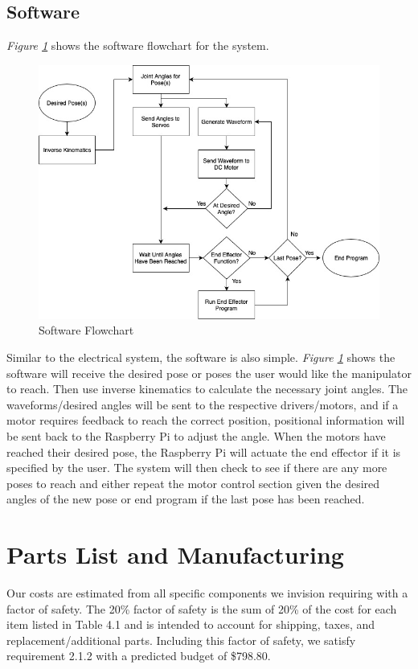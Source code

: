 \documentclass[12pt]{report}
\begin{document}
\subsection{Software}
\emph{Figure \ref{fig:sblock}} shows the software flowchart for the system.
\begin{figure}[ht]
  \centering
  \includegraphics[width=.85\textwidth]{sblock}
  \caption{Software Flowchart}
  \label{fig:sblock}
\end{figure}

Similar to the electrical system, the software is also simple. \emph{Figure \ref{fig:sblock}} shows the software will receive the desired pose or poses the user would like the manipulator to reach. Then use inverse kinematics to calculate the necessary joint angles. The waveforms/desired angles will be sent to the respective drivers/motors, and if a motor requires feedback to reach the correct position, positional information will be sent back to the Raspberry Pi to adjust the angle. When the motors have reached their desired pose, the Raspberry Pi will actuate the end effector if it is specified by the user. The system will then check to see if there are any more poses to reach and either repeat the motor control section given the desired angles of the new pose or end program if the last pose has been reached.

\section{Parts List and Manufacturing}
Our costs are estimated from all specific components we invision requiring with a factor of safety. The 20\% factor of safety is the sum of 20\% of the cost for each item listed in Table 4.1 and is intended to account for shipping, taxes, and replacement/additional parts. Including this factor of safety, we satisfy requirement 2.1.2 with a predicted budget of \$798.80.
\end{document}

